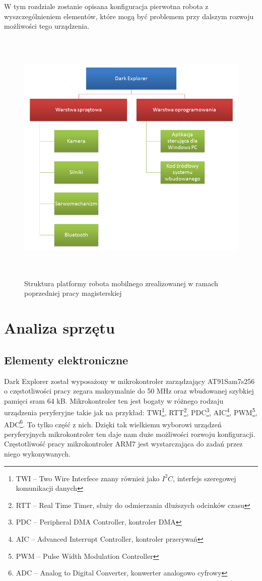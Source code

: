 W tym rozdziale zostanie opisana konfiguracja pierwotna robota z wyszczególnieniem elementów, które mogą być problemem przy dalszym rozwoju możliwości tego urządzenia.
\begin{figure}[!ht]
 \centering
 \includegraphics[height=125mm]{../images/ch02/kmak_platform.png}
 \caption{Struktura platformy robota mobilnego zrealizowanej w ramach
 poprzedniej pracy magisterskiej\cite{KmakMScThesis2009}}
 \label{fig:KmakPlatform}
\end{figure}

\section{Analiza sprzętu}
\subsection{Elementy elektroniczne}
Dark Explorer został wyposażony w mikrokontroler zarządzający AT91Sam7s256 o częstotliwości pracy zegara maksymalnie do 50 MHz oraz wbudowanej szybkiej pamięci sram 64 kB. Mikrokontroler ten jest bogaty w różnego rodzaju urządzenia peryferyjne takie jak na przykład: TWI\footnote{TWI -- Two Wire Interfece znany również jako $I^{2}C$, interfejs szeregowej komunikacji danych}, RTT\footnote{RTT -- Real Time Timer, służy do odmierzania dłuższych odcinków czasu}, PDC\footnote{PDC -- Peripheral DMA Controller, kontroler DMA}, AIC\footnote{AIC -- Advanced Interrupt Controller, kontroler przerywań}, PWM\footnote{PWM -- Pulse Width Modulation Controller}, ADC\footnote{ADC -- Analog to Digital Converter, konwerter analogowo cyfrowy}. To tylko część z nich. Dzięki tak wielkiemu wyborowi urządzeń peryferyjnych mikrokontroler ten daje nam duże możliwości rozwoju konfiguracji. Częstotliwość pracy mikrokontroler ARM7 jest wystarczająca do zadań przez niego wykonywanych.
\\


